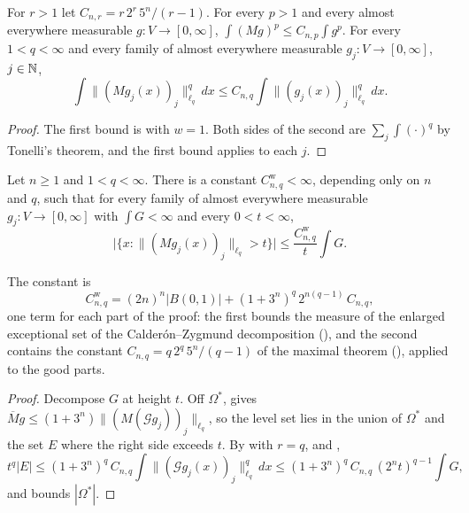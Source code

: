 \begin{lemma}[The case $q = p$ in integral form]
\label{lem:fefferman-stein-diagonal}
\leanok
{}
For $r > 1$ let $C_{n,r} = r \, 2^r \, 5^n / (r - 1)$. For every $p > 1$ and every almost
everywhere measurable $g : V \to [0, \infty]$, $\int (M g)^p \leq C_{n,p} \int g^p$. For every
$1 < q < \infty$ and every family of almost everywhere measurable $g_j : V \to [0, \infty]$,
$j \in \mathbb{N}$,
\[
  \int \|(M g_j(x))_j\|_{\ell_q}^q \, dx \leq C_{n,q} \int \|(g_j(x))_j\|_{\ell_q}^q \, dx .
\]
\end{lemma}

\begin{proof}
\leanok
The first bound is  with $w = 1$. Both sides of the second are
$\sum_j \int (\cdot)^q$ by Tonelli's theorem, and the first bound applies to each $j$.
\end{proof}

\begin{theorem}
\label{thm:vector-weak-type}
\leanok
{}
Let $n \geq 1$ and $1 < q < \infty$. There is a constant $C^{\mathrm w}_{n,q} < \infty$,
depending only on $n$ and $q$, such that for every family of almost everywhere measurable
$g_j : V \to [0, \infty]$ with $\int G < \infty$ and every $0 < t < \infty$,
\[
  \bigl|\{x : \|(M g_j(x))_j\|_{\ell_q} > t\}\bigr| \leq \frac{C^{\mathrm w}_{n,q}}{t} \int G .
\]
\end{theorem}

The constant is
\[
  C^{\mathrm w}_{n,q} = (2n)^n |B(0,1)| + (1 + 3^n)^q \, 2^{n(q-1)} \, C_{n,q} ,
\]
one term for each part of the proof: the first bounds the measure of the enlarged exceptional
set of the Calder\'on--Zygmund decomposition (), and the
second contains the constant $C_{n,q} = q \, 2^q \, 5^n / (q - 1)$ of the maximal theorem
(), applied to the good parts.

\begin{proof}
\leanok
{}
Decompose $G$ at height $t$. Off $\Omega^*$,  gives
$\overline M g \leq (1 + 3^n) \|(M(\mathcal G g_j))_j\|_{\ell_q}$, so the level set lies in the
union of $\Omega^*$ and the set $E$ where the right side exceeds $t$. By
 with $r = q$,  and
,
\[
  t^q |E| \leq (1 + 3^n)^q \, C_{n,q} \int \|(\mathcal G g_j(x))_j\|_{\ell_q}^q \, dx
  \leq (1 + 3^n)^q \, C_{n,q} \, (2^n t)^{q-1} \int G,
\]
and  bounds $|\Omega^*|$.
\end{proof}


